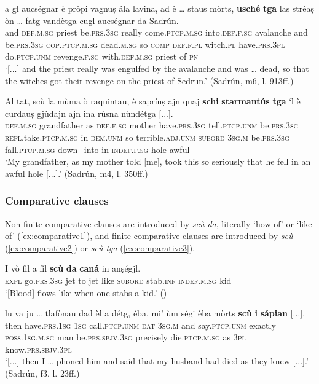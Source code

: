 \ea
\label{ex:consec5}
\gll    [...] a gl aucségnar è pròpi vagnuṣ ála lavina, ad è … staus mòrts, \textbf{usché} \textbf{tga} las stréaṣ òn … fatg vandètga cugl aucségnar da Sadrún.\\
{} and \textsc{def.m.sg} priest be.\textsc{prs.3sg} really come.\textsc{ptcp.m.sg} into.\textsc{def.f.sg} avalanche and be.\textsc{prs.3sg} {} \textsc{cop.ptcp.m.sg} dead.\textsc{m.sg} so \textsc{comp} \textsc{def.f.pl} witch.\textsc{pl} have.\textsc{prs.3pl} {} do.\textsc{ptcp.unm} revenge.\textsc{f.sg} with.\textsc{def.m.sg} priest of \textsc{pn}\\
\glt `[...] and the priest really was engulfed by the avalanche and was … dead, so that the witches got their revenge on the priest of Sedrun.' (Sadrún, m6, l. 913ff.)
\z



\ea
\label{ex:consec4}
\gll  Al tat, scù la mùma ò raquintau, è sapríuṣ ajn quaj \textbf{schi} \textbf{starmantús} \textbf{tga} `l è curdauṣ gjùdajn ajn ina rùsna nùndétga [...].\\
\textsc{def.m.sg} grandfather as  \textsc{def.f.sg} mother have.\textsc{prs.3sg} tell.\textsc{ptcp.unm} be.\textsc{prs.3sg} \textsc{refl.}take.\textsc{ptcp.m.sg} in \textsc{dem.unm} so terrible.\textsc{adj.unm} \textsc{subord} \textsc{3sg.m} be.\textsc{prs.3sg} fall.\textsc{ptcp.m.sg} down\_into in \textsc{indef.f.sg} hole awful\\
\glt `My grandfather, as my mother told [me], took this so seriously that he fell in an awful hole [...].' (Sadrún, m4, l. 350ff.)
\z

\subsubsection{Comparative clauses}
Non-finite comparative clauses are introduced by \textit{scù da}, literally `how of' or `like of' (\ref{ex:comparative1}), and finite comparative clauses are introduced by \textit{scù} (\ref{ex:comparative2}) or \textit{scù tga} (\ref{ex:comparative3}).


\ea
\label{ex:comparative1}
\gll  I vò fil a fil \textbf{scù} \textbf{da} \textbf{caná} in anṣégjl.\\
    \textsc{expl} go.\textsc{prs.3sg} jet to jet like \textsc{subord} stab.\textsc{inf} \textsc{indef.m.sg} kid \\
\glt `[Blood] flows like when one stabs a kid.' ()
\z

\ea
\label{ex:comparative2}
\gll  [...] lu va ju … tlafònau dad èl a détg, éba, mi' ùm ségi èba mòrts \textbf{scù} \textbf{i} \textbf{sápian} [...].\\
{} then have.\textsc{prs.1sg} \textsc{1sg} {} call.\textsc{ptcp.unm} \textsc{dat} \textsc{3sg.m} and say.\textsc{ptcp.unm} exactly \textsc{poss.1sg.m.sg} man be.\textsc{prs.sbjv.3sg} precisely die.\textsc{ptcp.m.sg} as \textsc{3pl} know.\textsc{prs.sbjv.3pl}\\ 
\glt `[...] then I … phoned him and said that my husband had died as they knew [...].' (Sadrún, f3, l. 23ff.)
\z

